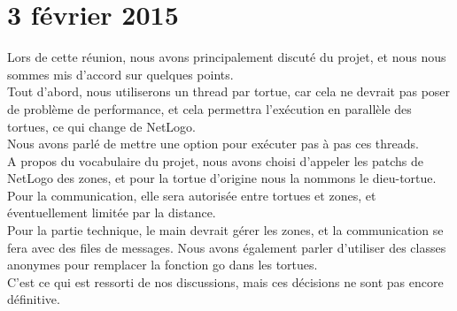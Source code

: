 \section{3 février 2015}
Lors de cette réunion, nous avons principalement discuté du projet, et nous nous sommes mis d'accord sur quelques points.\\
Tout d'abord, nous utiliserons un thread par tortue, car cela ne devrait pas poser de problème de performance, et cela permettra l'exécution en parallèle des tortues, ce qui change de NetLogo.\\ Nous avons parlé de mettre une option pour exécuter pas à pas ces threads.\\
A propos du vocabulaire du projet, nous avons choisi d'appeler les patchs de NetLogo des zones, et pour la tortue d'origine nous la nommons le dieu-tortue.\\
Pour la communication, elle sera autorisée entre tortues et zones, et éventuellement limitée par la distance.\\
Pour la partie technique, le main devrait gérer les zones, et la communication se fera avec des files de messages. Nous avons également parler d'utiliser des classes anonymes pour remplacer la fonction go dans les tortues.\\
C'est ce qui est ressorti de nos discussions, mais ces décisions ne sont pas encore définitive.